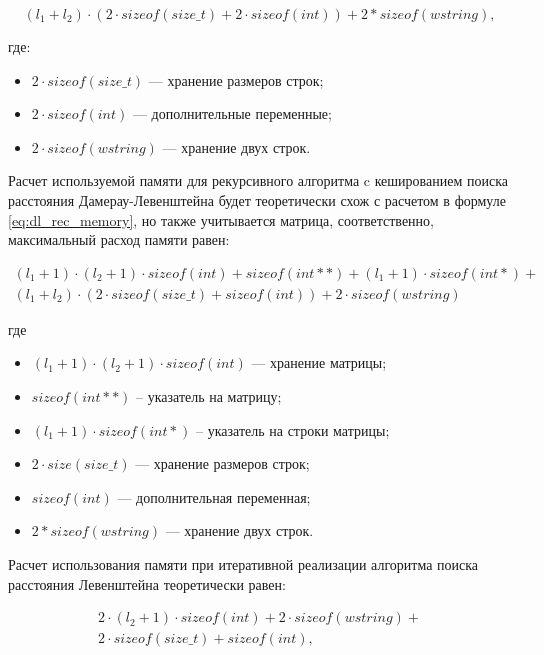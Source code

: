 \begin{equation}
	\label{eq:dl_rec_memory}
	(l_1 + l_2) \cdot ( 2 \cdot sizeof(size\_t)  + 2 \cdot sizeof(int)) + 2 * sizeof(wstring),
\end{equation}

где:
\begin{itemize}[label=--]
	\item $2 \cdot sizeof(size\_t)$ --- хранение размеров строк;
	\item $2 \cdot sizeof(int)$ --- дополнительные переменные;
	\item $2 \cdot sizeof(wstring)$ --- хранение двух строк.
\end{itemize}

Расчет используемой памяти для рекурсивного алгоритма c кешированием поиска расстояния Дамерау-Левенштейна будет теоретически схож с расчетом в формуле \ref{eq:dl_rec_memory}, но также учитывается матрица, соответственно, максимальный расход памяти равен:

\begin{equation}
	\label{eq:dl_hash_memory}
	\begin{aligned}
		(l_1 + 1) \cdot (l_2 + 1) \cdot sizeof(int) + sizeof(int **) + (l_1 + 1) \cdot sizeof(int *) + \\
		(l_1 + l_2) \cdot (2 \cdot sizeof(size\_t) + sizeof(int)) + 2 \cdot sizeof(wstring)
	\end{aligned}
\end{equation}

где 
\begin{itemize} [label=--]
	\item $(l_1 + 1) \cdot (l_2 + 1) \cdot sizeof(int)$ --- хранение матрицы;
	\item $sizeof(int **)$ -- указатель на матрицу;
	\item $(l_1 + 1) \cdot sizeof(int *)$ -- указатель на строки матрицы;
	\item $2 \cdot size(size\_t)$ --- хранение размеров строк;
	\item $sizeof(int)$ --- дополнительная переменная;
	\item $2 * sizeof(wstring)$ --- хранение двух строк.
\end{itemize}

Расчет использования памяти при итеративной реализации алгоритма поиска расстояния Левенштейна теоретически равен:

\begin{equation}
	\label{eq:lev_mtr_memory}
	\begin{aligned}
		2 \cdot (l_2 + 1) \cdot sizeof(int) +  2 \cdot sizeof(wstring) + \\
		 2 \cdot sizeof(size\_t) + sizeof(int),
	\end{aligned}
\end{equation}

